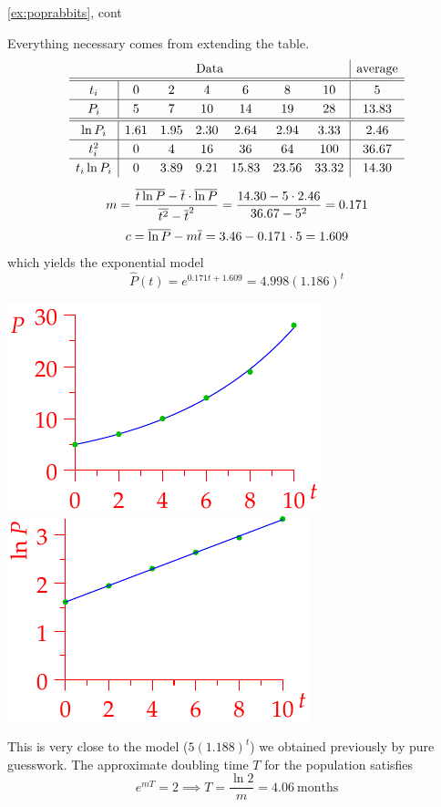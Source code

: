\begin{example*}{\ref{ex:poprabbits}, cont}{}
\begin{minipage}[t]{0.64\linewidth}\vspace{0pt}
Everything necessary comes from extending the table.
\begin{gather*}\def\arraystretch{1.2}
\begin{array}{c|cccccc|c}
\multicolumn{7}{c|}{\text{Data}}&\text{average}\\\hline\hline
t_i&0&2&4&6&8&10&5\\\hline
P_i&5&7&10&14&19&28&13.83\\\hline\hline
\ln P_i&1.61&1.95&2.30&2.64&2.94&3.33&2.46\\\hline
t_i^2&0&4&16&36&64&100&36.67\\\hline
t_i\ln P_i&0&3.89&9.21&15.83&23.56&33.32&14.30
\end{array}\\[5pt]
m=\frac{\cl{t\ln P}-\cl t\cdot\cl{\ln P}}{\cl{t^2}-\cl t^2}=\frac{14.30-5\cdot 2.46}{36.67-5^2} =0.171\\[2pt]
c=\cl{\ln P}-m\cl t=3.46-0.171\cdot 5=1.609
\end{gather*}
which yields the exponential model
\[\hat P(t)=e^{0.171t+1.609}=4.998(1.186)^t\]
\end{minipage}
\hfill
\begin{minipage}[t]{0.35\linewidth}\vspace{0pt}
\flushright\includegraphics{rabbits5}\\
\includegraphics{rabbits6}
\end{minipage}\medbreak

This is very close to the model ($5(1.188)^t$) we obtained previously by pure guesswork. The approximate doubling time $T$ for the population satisfies
\[e^{mT}=2\implies T=\frac{\ln 2}{m}=4.06\ \text{months}\]
\end{example*}


